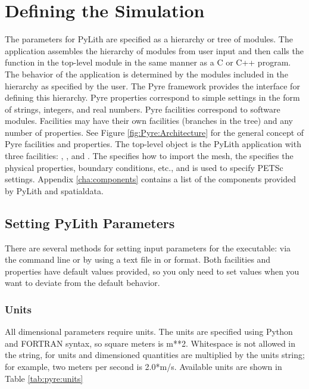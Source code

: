 \section{Defining the Simulation}

The parameters for PyLith are specified as a hierarchy or tree of
modules. The application assembles the hierarchy of modules from user
input and then calls the  function in the top-level
module in the same manner as a C or C++ program. The behavior of the
application is determined by the modules included in the hierarchy as
specified by the user. The Pyre framework provides the interface for
defining this hierarchy. Pyre properties correspond to simple settings
in the form of strings, integers, and real numbers. Pyre facilities
correspond to software modules. Facilities may have their own
facilities (branches in the tree) and any number of properties. See
Figure \vref{fig:Pyre:Architecture} for the general concept of Pyre
facilities and properties. The top-level object is the PyLith
application with three facilities: , ,
and . The  specifies how to import the
mesh, the  specifies the physical properties, boundary
conditions, etc., and  is used to specify PETSc
settings. Appendix \vref{cha:components} contains a list of the
components provided by PyLith and spatialdata.


\subsection{Setting PyLith Parameters}
\label{sec:setting:parameters}

There are several methods for setting input parameters for the
 executable: via the command line or by using a text
file in  or  format. Both facilities and
properties have default values provided, so you only need to set
values when you want to deviate from the default behavior.


\subsubsection{Units}

All dimensional parameters require units. The units are specified
using Python and FORTRAN syntax, so square meters is m**2. Whitespace
is not allowed in the string, for units and dimensioned quantities
are multiplied by the units string; for example, two meters per second
is 2.0*m/s. Available units are shown in Table \vref{tab:pyre:units}

